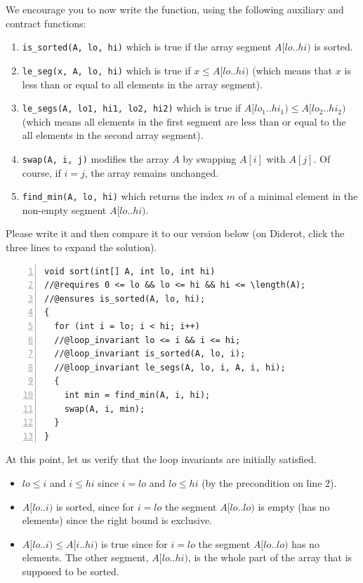 We encourage you to now write the function, using the following
auxiliary and contract functions:
\begin{enumerate}
\item%
  \lstinline'is_sorted(A, lo, hi)' which is true if the array segment
  $A\lbrack \mathit{lo}{..}\mathit{hi})$ is sorted.
\item%
  \lstinline'le_seg(x, A, lo, hi)' which is true if $x \leq
  A\lbrack \mathit{lo}{..}\mathit{hi})$ (which means that $x$ is less than
  or equal to all elements in the array segment).
\item%
  \lstinline'le_segs(A, lo1, hi1, lo2, hi2)' which is true if
  $A\lbrack \mathit{lo}_1{..}\mathit{hi}_1) \leq
  A\lbrack \mathit{lo}_2{..}\mathit{hi}_2)$ (which means all elements in the
  first segment are less than or equal to the all elements in the
  second array segment).
\item%
  \lstinline'swap(A, i, j)' modifies the array $A$ by swapping $A[i]$
  with $A[j]$.  Of course, if $i = j$, the array remains unchanged.
\item%
  \lstinline'find_min(A, lo, hi)' which returns the index $m$ of a
  minimal element in the non-empty segment $A\lbrack \mathit{lo}{..}\mathit{hi})$.
\end{enumerate}
\begin{flex}
\begin{gram}
    Please write it and then compare it to our version below (on Diderot, click
    the three lines to expand the solution).
\end{gram}

\begin{solution}
\begin{lstlisting}[language={[C0]C}, numbers=left]
void sort(int[] A, int lo, int hi)
//@requires 0 <= lo && lo <= hi && hi <= \length(A);
//@ensures is_sorted(A, lo, hi);
{
  for (int i = lo; i < hi; i++)
  //@loop_invariant lo <= i && i <= hi;
  //@loop_invariant is_sorted(A, lo, i);
  //@loop_invariant le_segs(A, lo, i, A, i, hi);
  {
    int min = find_min(A, i, hi);
    swap(A, i, min);
  }
}
\end{lstlisting}
\end{solution}
\end{flex}

At this point, let us verify that the loop invariants are initially
satisfied.
\begin{itemize}
\item%
  $\mathit{lo} \leq i$ and $i \leq \mathit{hi}$ since $i =
  \mathit{lo}$ and $\mathit{lo} \leq \mathit{hi}$ (by the \requires{}
  precondition on line 2).
\item%
  $A\lbrack \mathit{lo}{..}i)$ is sorted, since for $i = \mathit{lo}$ the
  segment $A\lbrack \mathit{lo}..\mathit{lo})$ is empty (has no elements)
  since the right bound is exclusive.
\item%
  $A\lbrack \mathit{lo}{..}i) \leq A\lbrack i{..}\mathit{hi})$ is true since for $i
  = \mathit{lo}$ the segment $A\lbrack \mathit{lo}{..}\mathit{lo})$ has no
  elements.  The other segment, $A\lbrack \mathit{lo}{..}\mathit{hi})$, is
  the whole part of the array that is supposed to be sorted.
\end{itemize}

